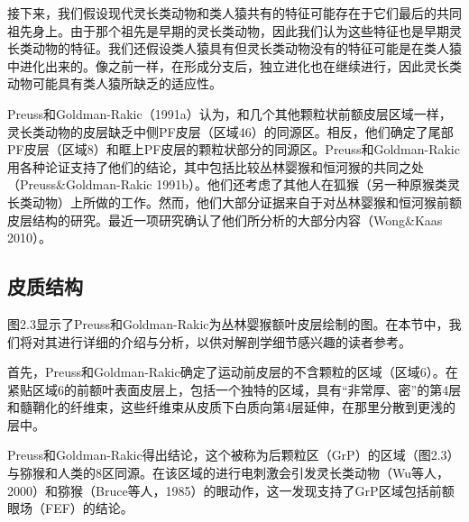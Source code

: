 接下来，我们假设现代灵长类动物和类人猿共有的特征可能存在于它们最后的共同祖先身上。由于那个祖先是早期的灵长类动物，因此我们认为这些特征也是早期灵长类动物的特征。我们还假设类人猿具有但灵长类动物没有的特征可能是在类人猿中进化出来的。像之前一样，在形成分支后，独立进化也在继续进行，因此灵长类动物可能具有类人猿所缺乏的适应性。

Preuss和Goldman-Rakic（1991a）认为，和几个其他颗粒状前额皮层区域一样，灵长类动物的皮层缺乏中侧PF皮层（区域46）的同源区。相反，他们确定了尾部PF皮层（区域8）和眶上PF皮层的颗粒状部分的同源区。Preuss和Goldman-Rakic用各种论证支持了他们的结论，其中包括比较丛林婴猴和恒河猴的共同之处（Preuss\&Goldman-Rakic 1991b）。他们还考虑了其他人在狐猴（另一种原猴类灵长类动物）上所做的工作。然而，他们大部分证据来自于对丛林婴猴和恒河猴前额皮层结构的研究。最近一项研究确认了他们所分析的大部分内容（Wong\&Kaas 2010）。

\subsection{皮质结构}
图2.3显示了Preuss和Goldman-Rakic为丛林婴猴额叶皮层绘制的图。在本节中，我们将对其进行详细的介绍与分析，以供对解剖学细节感兴趣的读者参考。

首先，Preuss和Goldman-Rakic确定了运动前皮层的不含颗粒的区域（区域6）。在紧贴区域6的前额叶表面皮层上，包括一个独特的区域，具有“非常厚、密”的第4层和髓鞘化的纤维束，这些纤维束从皮质下白质向第4层延伸，在那里分散到更浅的层中。

Preuss和Goldman-Rakic得出结论，这个被称为后颗粒区（GrP）的区域（图2.3）与猕猴和人类的8区同源。在该区域的进行电刺激会引发灵长类动物（Wu等人，2000）和猕猴（Bruce等人，1985）的眼动作，这一发现支持了GrP区域包括前额眼场（FEF）的结论。

